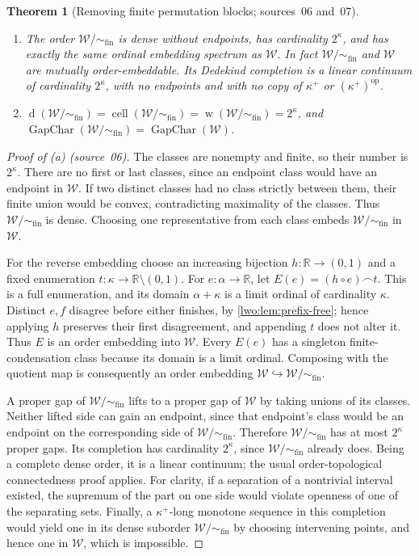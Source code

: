 \documentclass[11pt,a4paper]{article}
\newtheorem{theorem}{Theorem}[section]
\theoremstyle{definition}
\theoremstyle{remark}
\newcommand{\R}{\mathbb R}
\newcommand{\W}{\mathcal W}
\newcommand{\cat}{\mathbin{\frown}}
\newcommand{\dens}{\operatorname{d}}
\newcommand{\cell}{\operatorname{cell}}
\newcommand{\emb}{\hookrightarrow}
\newcommand{\rev}{\mathrm{op}}
\newcommand{\weight}{\operatorname{w}}
\newcommand{\Wq}{\W/{\sim_{\mathrm{fin}}}}
\newcommand{\GapChar}{\operatorname{GapChar}}
\begin{document}
\begin{theorem}[Removing finite permutation blocks; sources~06 and~07]\label{lwo:sp:thm:quotient}
\leavevmode
\begin{enumerate}[label=(\alph*)]
\item The order $\Wq$ is dense without endpoints, has cardinality $2^\kappa$,
and has exactly the same ordinal embedding spectrum as $\W$. In fact $\Wq$ and
$\W$ are mutually order-embeddable. Its Dedekind completion is a linear
continuum of cardinality $2^\kappa$, with no endpoints and with no copy of
$\kappa^+$ or $(\kappa^+)^{\rev}$.
\item $\dens(\Wq)=\cell(\Wq)=\weight(\Wq)=2^\kappa$, and
$\GapChar(\Wq)=\GapChar(\W)$.
\end{enumerate}
\end{theorem}
\begin{proof}[Proof of \textup{(a)} \textup{(source~06)}]
The classes are nonempty and finite, so their number is $2^\kappa$. There are
no first or last classes, since an endpoint class would have an endpoint in
$\W$. If two distinct classes had no class strictly between them, their finite
union would be convex, contradicting maximality of the classes. Thus $\Wq$ is
dense. Choosing one representative from each class embeds $\Wq$ in $\W$.

For the reverse embedding choose an increasing bijection $h:\R\to(0,1)$ and a
fixed enumeration $t:\kappa\to\R\setminus(0,1)$. For $e:\alpha\to\R$, let
$E(e)=(h\circ e)\cat t$. This is a full enumeration, and its domain
$\alpha+\kappa$ is a limit ordinal of cardinality $\kappa$. Distinct $e,f$
disagree before either finishes, by \cref{lwo:lem:prefix-free}; hence applying
$h$ preserves their first disagreement, and appending $t$ does not alter it.
Thus $E$ is an order embedding into $\W$. Every $E(e)$ has a singleton
finite-condensation class because its domain is a limit ordinal. Composing
with the quotient map is consequently an order embedding $\W\emb\Wq$.

A proper gap of $\Wq$ lifts to a proper gap of $\W$ by taking unions of its
classes. Neither lifted side can gain an endpoint, since that endpoint's class
would be an endpoint on the corresponding side of $\Wq$. Therefore $\Wq$ has at
most $2^\kappa$ proper gaps. Its completion has cardinality $2^\kappa$, since
$\Wq$ already does. Being a complete dense order, it is a linear continuum; the
usual order-topological connectedness proof applies. For clarity, if a
separation of a nontrivial interval existed, the supremum of the part on one
side would violate openness of one of the separating sets. Finally, a
$\kappa^+$-long monotone sequence in this completion would yield one in its
dense suborder $\Wq$ by choosing intervening points, and hence one in $\W$,
which is impossible.
\end{proof}
\end{document}
